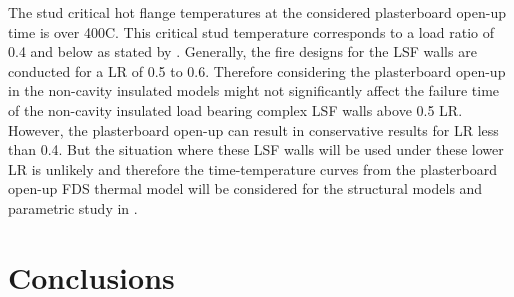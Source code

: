 The stud critical hot flange temperatures at the considered plasterboard open-up time is over 400\degree C. This critical stud temperature corresponds to a load ratio of 0.4 and below as stated by \citet{Gunalan2013a}. Generally, the fire designs for the LSF walls are conducted for a LR of 0.5 to 0.6. Therefore considering the plasterboard open-up in the non-cavity insulated models might not significantly affect the failure time of the non-cavity insulated load bearing complex LSF walls above 0.5 LR. However, the plasterboard open-up can result in conservative results for LR less than 0.4. But the situation where these LSF walls will be used under these lower LR is unlikely and therefore the time-temperature curves from the plasterboard open-up FDS thermal model will be considered for the structural models and parametric study in .

\section{Conclusions}

